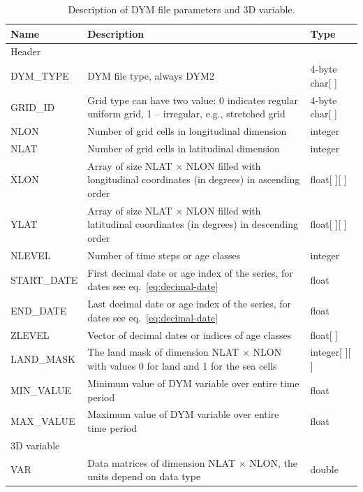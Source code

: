 \begin{table}
\caption{Description of DYM file parameters and 3D variable. }
\begin{tabular}{p{2cm}p{10cm}p{2.5cm}}
    \hline
    {\bfseries Name} &  {\bfseries Description}  & {\bfseries} Type\\ \hline\hline 
    \multicolumn{3}{l}{\cellcolor[gray]{0.8} Header}\\ \hline
    {\ttfamily DYM\_TYPE} & DYM file type, always DYM2  & 4-byte char[ ] \\ \hline 
    {\ttfamily GRID\_ID}  & Grid type can have two value:  0 indicates regular uniform grid, 1 -- irregular, e.g., stretched grid & 4-byte char[ ] \\ \hline 
    {\ttfamily NLON} &  Number of grid cells in longitudinal dimension  & integer \\ \hline 
    {\ttfamily NLAT} &  Number of grid cells in latitudinal dimension  & integer \\ \hline 
 	{\ttfamily XLON} & Array of size {\ttfamily NLAT} $\times$ {\ttfamily NLON} filled with longitudinal coordinates (in degrees) in ascending order  & float[ ][ ]\\ \hline 
	{\ttfamily YLAT} & Array of size {\ttfamily NLAT} $\times$ {\ttfamily NLON} filled with latitudinal coordinates (in degrees) in descending order  & float[ ][ ] \\ \hline 
    {\ttfamily NLEVEL} & Number of time steps or age classes & integer\\ \hline 	
 	{\ttfamily START\_DATE} & First decimal date or age index of the series, for dates see eq.~\ref{eq:decimal-date} & float \\  \hline    
 	{\ttfamily END\_DATE} & Last decimal date or age index of the series, for dates see eq.~\ref{eq:decimal-date}  & float \\ \hline 
	{\ttfamily ZLEVEL} & Vector of decimal dates or indices of age classes  & float[ ] \\ \hline 
	{\ttfamily LAND\_MASK}  & The land mask of dimension {\ttfamily NLAT} $\times$ {\ttfamily NLON} with values $0$ for land and 1 for the sea cells & integer[ ][ ] \\\hline
    {\ttfamily MIN\_VALUE} & Minimum value of DYM variable over entire time period & float \\\hline	
	{\ttfamily MAX\_VALUE} & Maximum value of DYM variable over entire time period & float \\\hline \hline
    \multicolumn{3}{l}{\cellcolor[gray]{0.8} 3D variable}\\ \hline	
	{\ttfamily VAR}  & Data matrices of dimension {\ttfamily NLAT} $\times$ {\ttfamily NLON}, the units depend on data type & double \\ \hline
\end{tabular}
\label{tab:variables-dymfile}
\end{table}

